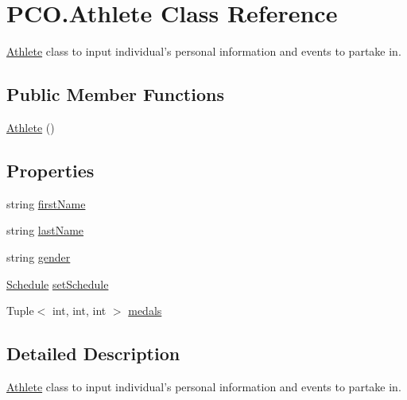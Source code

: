 \hypertarget{classPCO_1_1Athlete}{\section{P\+C\+O.\+Athlete Class Reference}
\label{classPCO_1_1Athlete}
}


\hyperlink{classPCO_1_1Athlete}{Athlete} class to input individual's personal information and events to partake in.  


\subsection*{Public Member Functions}
\begin{DoxyCompactItemize}
\item 
\hyperlink{classPCO_1_1Athlete_a65af66e3b9da62287fbcd73cb1903280}{Athlete} ()
\end{DoxyCompactItemize}
\subsection*{Properties}
\begin{DoxyCompactItemize}
\item 
string \hyperlink{classPCO_1_1Athlete_a6167fdc1ef5b40ec091f3c81a8da3a8c}{first\+Name}
\item 
string \hyperlink{classPCO_1_1Athlete_a8585d7d2291f32ef95be2934840b734a}{last\+Name}
\item 
string \hyperlink{classPCO_1_1Athlete_af1d423796bbb1680beb437ced0def7b4}{gender}
\item 
\hyperlink{classPCO_1_1Schedule}{Schedule} \hyperlink{classPCO_1_1Athlete_a64a37dcb54d6428079498964da17801d}{set\+Schedule}
\item 
Tuple$<$ int, int, int $>$ \hyperlink{classPCO_1_1Athlete_a99ff064c8d40bcb39a7dac132a9146e4}{medals}
\end{DoxyCompactItemize}


\subsection{Detailed Description}
\hyperlink{classPCO_1_1Athlete}{Athlete} class to input individual's personal information and events to partake in. 

